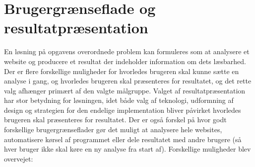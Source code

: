 \documentclass[a4paper,oneside]{memoir}
\begin{document}
\section{Brugergrænseflade og resultatpræsentation}
\label{brugergraenseflade}
En løsning på opgavens overordnede problem kan formuleres som at
analysere et website og producere et resultat der indeholder
information om dets læsbarhed. Der er flere forskellige muligheder for
hvorledes brugeren skal kunne sætte en analyse i gang, og hvorledes
brugeren skal præsenteres for resultatet, og det rette valg afhænger
primært af den valgte målgruppe. Valget af resultatpræsentation har
stor betydning for løsningen, idet både valg af teknologi, udformning
af design og strategien for den endelige implementation bliver
påvirket hvorledes brugeren skal præsenteres for resultatet. Der er
også forskel på hvor godt forskellige brugergrænseflader gør det
muligt at analysere hele websites, automatisere kørsel af programmet
eller dele resultatet med andre brugere (så hver bruger ikke skal køre
en ny analyse fra start af). Forskellige muligheder blev overvejet:
\end{document}
